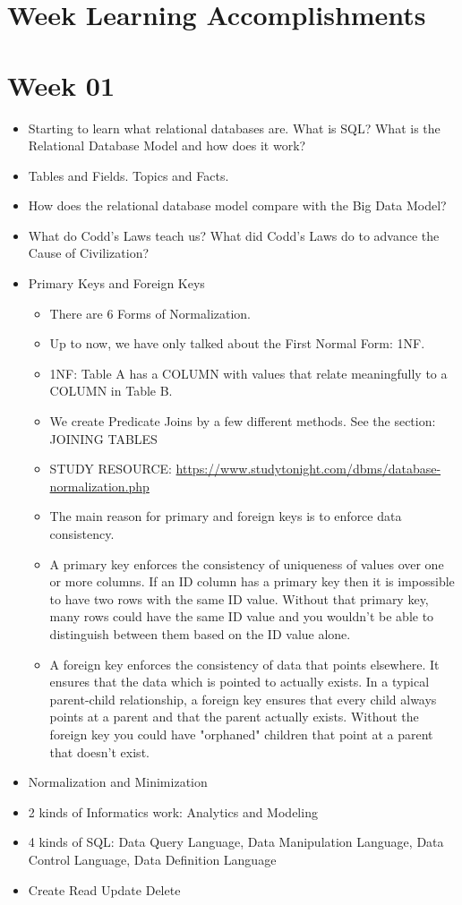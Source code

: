 \section * {Week Learning Accomplishments}

\section * {Week 01}			

\begin{itemize}
\item Starting to learn what relational databases are. What is SQL? What is the Relational Database Model and how does it work?
\item Tables and Fields. Topics and Facts.
\item How does the relational database model compare with the Big Data Model?
\item What do Codd's Laws teach us? What did Codd's Laws do to advance the Cause of Civilization?
\item Primary Keys and Foreign Keys
\begin{itemize}
\item There are 6 Forms of Normalization.
\item Up to now, we have only talked about the First Normal Form: 1NF.
\item 1NF: Table A has a COLUMN with values that relate meaningfully to a COLUMN in Table B.
\item We create Predicate Joins by a few different methods. See the section: JOINING TABLES 
\item STUDY RESOURCE: \url{https://www.studytonight.com/dbms/database-normalization.php}
\end{itemize}

\begin{itemize}
\item The main reason for primary and foreign keys is to enforce data consistency.
\item A primary key enforces the consistency of uniqueness of values over one or more columns. If an ID column has a primary key then it is impossible to have two rows with the same ID value. Without that primary key, many rows could have the same ID value and you wouldn't be able to distinguish between them based on the ID value alone.
\item A foreign key enforces the consistency of data that points elsewhere. It ensures that the data which is pointed to actually exists. In a typical parent-child relationship, a foreign key ensures that every child always points at a parent and that the parent actually exists. Without the foreign key you could have "orphaned" children that point at a parent that doesn't exist.
\end{itemize}
\item Normalization and Minimization
\item 2 kinds of Informatics work: Analytics and Modeling
\item 4 kinds of SQL: Data Query Language, Data Manipulation Language, Data Control Language, Data Definition Language
\item Create Read Update Delete
\end{itemize}

